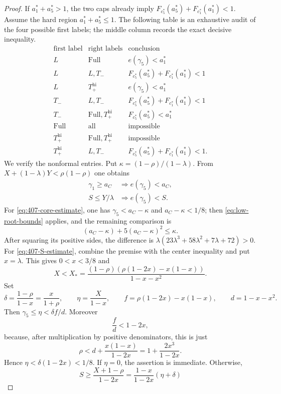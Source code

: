 \begin{proof}
If $a_1^\ast+a_5^\ast>1$, the two caps already imply
$F_{c_5^\ast}(a_5^\ast)+F_{c_1^\ast}(a_1^\ast)<1$.  Assume the hard region
$a_1^\ast+a_5^\ast\le1$.  The following table is an exhaustive audit of the four
possible first labels; the middle column records the exact decisive
inequality.
\[
\begin{array}{c|c|c}
\text{first label}&\text{right labels}&\text{conclusion}\\ \hline
L&\mathrm{Full}&e(\gamma_5)<a_1^\ast\\
L&L,T_-&F_{c_5^\ast}(a_5^\ast)+F_{c_1^\ast}(a_1^\ast)<1\\
L&T_+^{\mathrm{hi}}&e(\gamma_5)<a_1^\ast\\
T_-&L,T_-&F_{c_5^\ast}(a_5^\ast)+F_{c_1^\ast}(a_1^\ast)<1\\
T_-&\mathrm{Full},T_+^{\mathrm{hi}}&F_{c_5^\ast}(a_5^\ast)<a_1^\ast\\
\mathrm{Full}&\text{all}&\text{impossible}\\
T_+^{\mathrm{hi}}&\mathrm{Full},T_+^{\mathrm{hi}}&\text{impossible}\\
T_+^{\mathrm{hi}}&L,T_-&F_{c_5^\ast}(a_5^\ast)+F_{c_1^\ast}(a_1^\ast)<1.
\end{array}
\]
We verify the nonformal entries.  Put
$\kappa=(1-\rho)/(1-\lambda)$.  From
$X+(1-\lambda)Y<\rho(1-\rho)$ one obtains
\begin{align}
 \gamma_1\ge a_C&\Longrightarrow e(\gamma_5)<a_C,
 \label{eq:407-core-estimate}\\
 S\le Y/\lambda&\Longrightarrow e(\gamma_5)<S.
 \label{eq:407-S-estimate}
\end{align}
For \eqref{eq:407-core-estimate}, one has
$\gamma_5<a_C-\kappa$ and
$a_C-\kappa<1/8$; then \eqref{eq:low-root-bounds} applies, and the remaining
comparison is
\[
 (a_C-\kappa)+5(a_C-\kappa)^2\le\kappa.
\]
After squaring its positive sides, the difference is
$\lambda(23\lambda^3+58\lambda^2+7\lambda+72)>0$.
For \eqref{eq:407-S-estimate}, combine the premise with the center
inequality and put $x=\lambda$.  This gives $0<x<3/8$ and
\[
 X<X_*=\frac{(1-\rho)(\rho(1-2x)-x(1-x))}{1-x-x^2}.
\]
Set
\[
 \delta=\frac{1-\rho}{1-x}=\frac{x}{1+\rho},\qquad
 \eta=\frac{X}{1-x},\qquad
 f=\rho(1-2x)-x(1-x),\qquad d=1-x-x^2.
\]
Then $\gamma_5\le\eta<\delta f/d$.  Moreover
\[
 \frac fd<1-2x,
\]
because, after multiplication by positive denominators, this is just
\[
 \rho<d+\frac{x(1-x)}{1-2x}
 =1+\frac{2x^3}{1-2x}.
\]
Hence $\eta<\delta(1-2x)<1/8$.  If $\eta=0$, the assertion is immediate.
Otherwise,
\[
 S\ge\frac{X+1-\rho}{1-2x}
 =\frac{1-x}{1-2x}(\eta+\delta)
\]
\end{proof}
